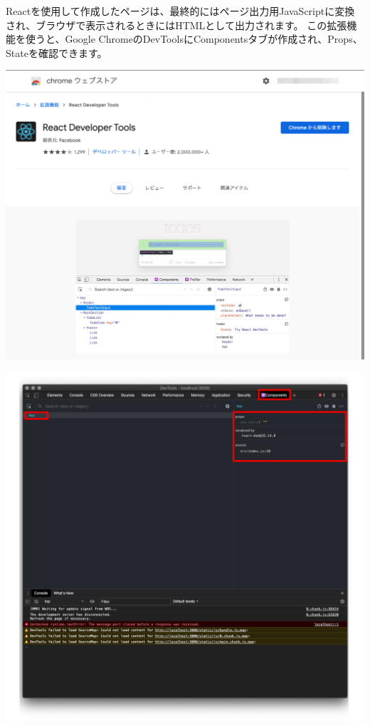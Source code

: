 Reactを使用して作成したページは、最終的にはページ出力用JavaScriptに変換され、ブラウザで表示されるときにはHTMLとして出力されます。
この拡張機能を使うと、Google ChromeのDevToolsにComponentsタブが作成され、Props、Stateを確認できます。

\begin{reviewimage}[H]%
\includegraphics[width=1.0\maxwidth]{./images/01-createDevEnv/01_10chromeExtReactDevTools.png}%
\label{image:01-createDevEnv:01_10chromeExtReactDevTools}
\end{reviewimage}
\begin{reviewimage}[H]%
\includegraphics[width=1.0\maxwidth]{./images/01-createDevEnv/01_12chromeExtReactDevTools01.png}%
\label{image:01-createDevEnv:01_12chromeExtReactDevTools01}
\end{reviewimage}

